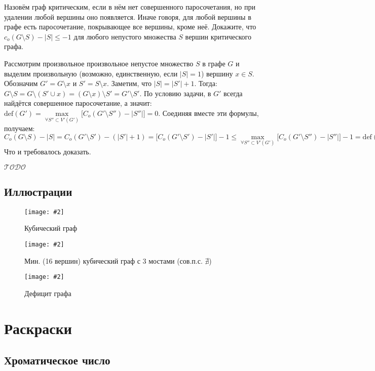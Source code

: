 \documentclass[a4paper,12pt]{article}
\numberwithin{figure}{section}
\def\TODO{\guillemotleft$\mathcal{TODO}$\guillemotright\textellipsis}
\newcommand\CenterFigureCaption[3]{\begin{figure}[H]\centering\texttt{[image: \#2]}\caption{#3}\end{figure}}
\begin{document}
\begin{problem}
  Назовём граф критическим, если в нём нет совершенного паросочетания, но при удалении любой вершины оно появляется. Иначе говоря, для любой вершины в графе есть паросочетание,	покрывающее все вершины, кроме неё. Докажите, что $c_o(G \setminus S) - |S| \leqslant -1$ для любого непустого множества $S$ вершин критического графа.
\end{problem}
\begin{solution}
  Рассмотрим произвольное произвольное непустое множество $S$ в графе $G$
  и выделим произвольную (возможно, единственную, если $|S|=1$) вершину $x \in S$.
  Обозначим $G' = G \setminus x$ и $S' = S \setminus x$.
  Заметим, что $ |S| = |S'| + 1 $.
  Тогда:
  $ G \setminus S = G \setminus (S' \cup x) = (G \setminus x) \setminus S' = G' \setminus S' $.
  По условию задачи, в $G'$ всегда найдётся совершенное паросочетание, а значит:
  $ \mathrm{def}(G') = \max \limits_{\forall S'' \subset V'(G')} \big[ C_o(G' \setminus S'') - |S''| \big] = 0 $.
  Соединяя вместе эти формулы, получаем:
  $C_o(G \setminus S) - |S| = C_o(G' \setminus S') - (|S'| + 1) = \big[ C_o(G' \setminus S') - |S'| \big] - 1 \leqslant
   \max \limits_{\forall S'' \subset V'(G')} \big[ C_o(G' \setminus S'') - |S''| \big] - 1
   = \mathrm{def}(G') - 1 = 0 - 1 = -1 $
  Что и требовалось доказать. 
\end{solution}

\TODO


\subsection{Иллюстрации}

\CenterFigureCaption{7cm}{cubic-graph-example1.png}{Кубический граф}

\CenterFigureCaption{9cm}{minimum-cubic-graph-with3-bridges.png}{Мин. (16 вершин) кубический граф с 3 мостами (сов.п.с. $\nexists$)}

\CenterFigureCaption{10cm}{matching-deficit-2.png}{Дефицит графа}



\section{Раскраски}


\subsection{Хроматическое число}
\end{document}
